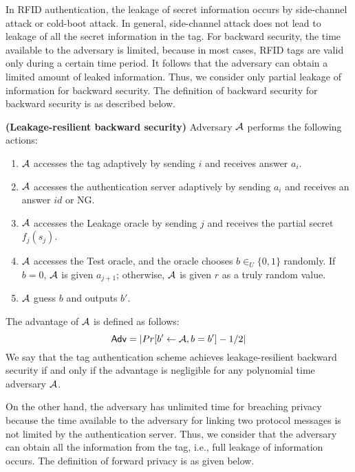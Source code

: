 \documentclass[english]{llncs}
\begin{document}
In RFID authentication, the leakage of secret information occurs by
side-channel attack or cold-boot attack. In general, side-channel
attack does not lead to leakage of all the secret information in the
tag. For backward security, the time available to the adversary
is limited, because in most cases, RFID tags are valid only during
a certain time period. It follows that the adversary can obtain a
limited amount of leaked information. Thus, we consider only partial
leakage of information for backward security. The definition of backward
security for backward security is as described below.
\begin{definition}
\textbf{(Leakage-resilient backward security)} Adversary ${\cal A}$
performs the following actions: 
\begin{enumerate}
\item ${\cal A}$ accesses the tag adaptively by sending $i$ and receives
answer $a_{i}$. 
\item ${\cal A}$ accesses the authentication server adaptively by sending
$a_{i}$ and receives an answer $id$ or NG. 
\item ${\cal A}$ accesses the Leakage oracle by sending $j$ and receives
the partial secret $f_{j}(s_{j})$. 
\item ${\cal A}$ accesses the Test oracle, and the oracle chooses $b\in_{U}\{0,1\}$
randomly. If $b=0$, ${\cal A}$ is given $a_{j+1}$; otherwise, ${\cal A}$
is given $r$ as a truly random value. 
\item ${\cal A}$ guess $b$ and outputs $b'$. 
\end{enumerate}
The advantage of ${\cal A}$ is defined as follows: \[
{\sf Adv}=|Pr[b'\leftarrow{\cal A},b=b']-1/2|\]
 We say that the tag authentication scheme achieves leakage-resilient
backward security if and only if the advantage is negligible for any
polynomial time adversary ${\cal A}$. 
\end{definition}
On the other hand, the adversary has unlimited time for breaching
privacy because the time available to the adversary for linking two
protocol messages is not limited by the authentication server. Thus,
we consider that the adversary can obtain all the information from
the tag, i.e., full leakage of information occurs. The definition
of forward privacy is as given below.
\end{document}
